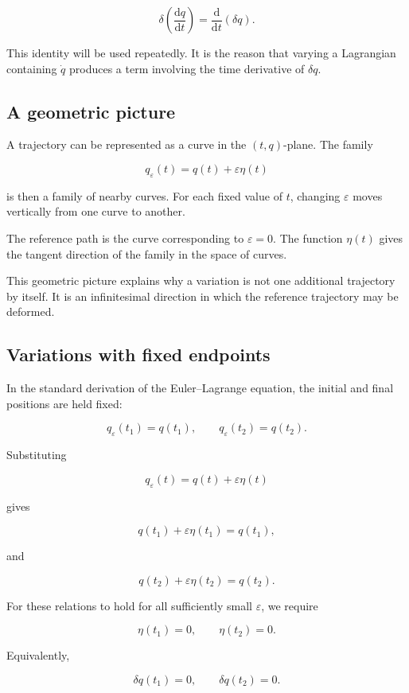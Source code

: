\[
\delta\left(\frac{\mathrm{d}q}{\mathrm{d}t}\right)
=
\frac{\mathrm{d}}{\mathrm{d}t}(\delta q).
\]

This identity will be used repeatedly. It is the reason that varying a Lagrangian containing \(\dot q\) produces a term involving the time derivative of \(\delta q\).

\subsection{A geometric picture}

A trajectory can be represented as a curve in the \((t,q)\)-plane. The family

\[
q_{\varepsilon}(t)
=
q(t)+\varepsilon\eta(t)
\]

is then a family of nearby curves. For each fixed value of \(t\), changing \(\varepsilon\) moves vertically from one curve to another.

The reference path is the curve corresponding to \(\varepsilon=0\). The function \(\eta(t)\) gives the tangent direction of the family in the space of curves.

This geometric picture explains why a variation is not one additional trajectory by itself. It is an infinitesimal direction in which the reference trajectory may be deformed.

\subsection{Variations with fixed endpoints}

In the standard derivation of the Euler--Lagrange equation, the initial and final positions are held fixed:

\[
q_{\varepsilon}(t_{1})=q(t_{1}),
\qquad
q_{\varepsilon}(t_{2})=q(t_{2}).
\]

Substituting

\[
q_{\varepsilon}(t)=q(t)+\varepsilon\eta(t)
\]

gives

\[
q(t_{1})+\varepsilon\eta(t_{1})=q(t_{1}),
\]

and

\[
q(t_{2})+\varepsilon\eta(t_{2})=q(t_{2}).
\]

For these relations to hold for all sufficiently small \(\varepsilon\), we require

\[
\boxed{
\eta(t_{1})=0,
\qquad
\eta(t_{2})=0
}.
\]

Equivalently,

\[
\delta q(t_{1})=0,
\qquad
\delta q(t_{2})=0.
\]

